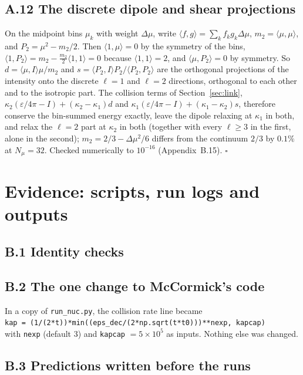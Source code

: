 \documentclass[11pt]{article}
\begin{document}
\subsection*{A.12 The discrete dipole and shear projections}
On the midpoint bins $\mu_k$ with weight $\Delta\mu$, write $\langle f,g\rangle=\sum_kf_kg_k\Delta\mu$, $m_2=\langle\mu,\mu\rangle$, and $P_2=\mu^2-m_2/2$. Then $\langle1,\mu\rangle=0$ by the symmetry of the bins, $\langle1,P_2\rangle=m_2-\tfrac{m_2}{2}\langle1,1\rangle=0$ because $\langle1,1\rangle=2$, and $\langle\mu,P_2\rangle=0$ by symmetry. So $d=\langle\mu,I\rangle\mu/m_2$ and $s=\langle P_2,I\rangle P_2/\langle P_2,P_2\rangle$ are the orthogonal projections of the intensity onto the discrete $\ell=1$ and $\ell=2$ directions, orthogonal to each other and to the isotropic part. The collision terms of Section~\ref{sec:link}, $\kappa_2(\varepsilon/4\pi-I)+(\kappa_2-\kappa_1)d$ and $\kappa_1(\varepsilon/4\pi-I)+(\kappa_1-\kappa_2)s$, therefore conserve the bin-summed energy exactly, leave the dipole relaxing at $\kappa_1$ in both, and relax the $\ell=2$ part at $\kappa_2$ in both (together with every $\ell\ge3$ in the first, alone in the second); $m_2=2/3-\Delta\mu^2/6$ differs from the continuum $2/3$ by $0.1\%$ at $N_\mu=32$. Checked numerically to $10^{-16}$ (Appendix~B.15). $\square$



\section{Evidence: scripts, run logs and outputs}
\subsection*{B.1 Identity checks}


\subsection*{B.2 The one change to McCormick's code}
In a copy of \texttt{run\_nuc.py}, the collision rate line became\\
\texttt{kap = (1/(2*t))*min((eps\_dec/(2*np.sqrt(t*t0)))**nexp, kapcap)}\\
with \texttt{nexp} (default 3) and \texttt{kapcap} $=5\times10^5$ as inputs. Nothing else was changed.


\subsection*{B.3 Predictions written before the runs}

\end{document}
